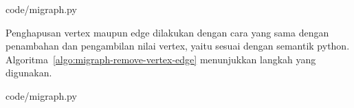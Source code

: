 
                {code/migraph.py}

Penghapusan vertex maupun edge dilakukan dengan cara yang sama dengan penambahan dan pengambilan nilai vertex, yaitu sesuai dengan semantik python. Algoritma~\ref{algo:migraph-remove-vertex-edge} menunjukkan langkah yang digunakan.


                {code/migraph.py}

